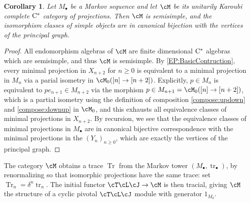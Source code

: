 \documentclass[11pt]{article}
\theoremstyle{plain}
\newtheorem{cor}[thm]{Corollary}
\theoremstyle{definition}
\DeclareMathOperator{\Tr}{Tr}
\DeclareMathOperator{\tr}{tr}
\newcommand{\Cstar}{\rm{C^*}}
\newcommand{\TLJ}{\cT\cL\cJ}
\begin{document}
\begin{cor}
\label{cor:SemisimpleProjectionCategory}
Let $M_\bullet$ be a Markov sequence and let $\cM$ be its unitarily Karoubi complete $\Cstar$ category of projections.
Then $\cM$ is semisimple, and the isomorphism classes of simple objects are in canonical bijection with the vertices of the principal graph.
\end{cor}
\begin{proof}
All endomorphism algebras of $\cM$ are finite dimensional $\Cstar$ algebras which are semisimple, and thus $\cM$ is semisimple. By \ref{EP:BasicContruction}, every minimal projection in $X_{n+2}$ for $n\geq 0$ is equivalent to a minimal projection in $M_{n}$ via a parial isometry in $\cM_0([n] \to [n+2])$. 
Explicitly, $p\in M_n$ is equivalent to $p e_{n+1} \in M_{n+2}$ via the morphism $p\in M_{n+1} = \cM_0([n] \to [n+2])$, which is a partial isometry using the definition of composition \ref{compose:updown} and \ref{compose:downup} in $\cM_0$, and this exhausts all equivalence classes of minimal projections in $X_{n+2}$.
By recursion, we see that the equivalence classes of minimal projections in $M_\bullet$ are in canonical bijective correspondence with the minimal projections in the $(Y_n)_{n\geq 0}$, which are exactly the vertices of the principal graph.
\end{proof}

The category $\cM$ obtains a trace $\Tr$ from the Markov tower $(M_\bullet,\tr_\bullet)$, by renormalizing so that isomorphic projections have the same trace: set $\Tr_n=\delta^n\tr_n$. The initial functor $\TLJ\to\cM$ is then tracial, giving $\cM$ the structure of a cyclic pivotal $\TLJ$ module with generator $1_{M_0}$. 
\end{document}
